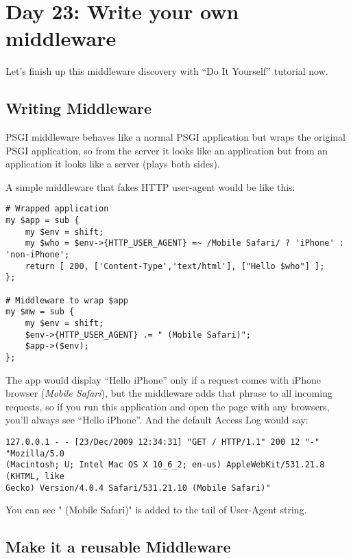 \section{Day 23: Write your own
middleware}\label{day-23-write-your-own-middleware}

Let's finish up this middleware discovery with ``Do It Yourself''
tutorial now.

\subsection{Writing Middleware}\label{writing-middleware}

PSGI middleware behaves like a normal PSGI application but wraps the
original PSGI application, so from the server it looks like an
application but from an application it looks like a server (plays both
sides).

A simple middleware that fakes HTTP user-agent would be like this:

\begin{lstlisting}
# Wrapped application
my $app = sub {
    my $env = shift;
    my $who = $env->{HTTP_USER_AGENT} =~ /Mobile Safari/ ? 'iPhone' : 'non-iPhone';
    return [ 200, ['Content-Type','text/html'], ["Hello $who"] ];
};

# Middleware to wrap $app
my $mw = sub {
    my $env = shift;
    $env->{HTTP_USER_AGENT} .= " (Mobile Safari)";
    $app->($env);
};
\end{lstlisting}

The app would display ``Hello iPhone'' only if a request comes with
iPhone browser (\emph{Mobile Safari}), but the middleware adds that
phrase to all incoming requests, so if you run this application and open
the page with any browsers, you'll always see ``Hello iPhone''. And the
default Access Log would say:

\begin{lstlisting}
127.0.0.1 - - [23/Dec/2009 12:34:31] "GET / HTTP/1.1" 200 12 "-" "Mozilla/5.0 
(Macintosh; U; Intel Mac OS X 10_6_2; en-us) AppleWebKit/531.21.8 (KHTML, like
Gecko) Version/4.0.4 Safari/531.21.10 (Mobile Safari)"
\end{lstlisting}

You can see " (Mobile Safari)" is added to the tail of User-Agent
string.

\subsection{Make it a reusable
Middleware}\label{make-it-a-reusable-middleware}

